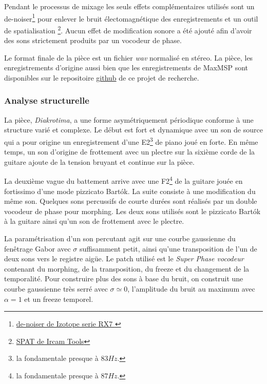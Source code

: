 Pendant le processus de mixage les seuls effets complémentaires utilisés sont un de-noiser\footnote{\href{https://www.izotope.com/en/products/repair-and-edit/rx.html}{de-noiser de Izotope serie RX7 }} pour enlever le bruit électomagnétique des enregistrements et un outil de spatialisation \footnote{\href{http://forumnet.ircam.fr/product/spat-en/}{SPAT de Ircam Tools}}. Aucun effet de modification sonore a été ajouté afin d'avoir des sons strictement produits par un vocodeur de phase.

Le format finale de la pièce est un fichier \textit{wav} normalisé en stéreo. La pièce, les enregistrements d'origine aussi bien que les enregistrements de MaxMSP sont disponibles sur le repositoire \href{https://github.com/melkisedeath/Memoire-du-Master-Paris8---Domaines-fondtionnels-du-vocodeur-de-phase}{github} de ce projet de recherche. 

\subsubsection{Analyse structurelle}

La pièce, \textit{Diakrotima}, a une forme asymétriquement périodique conforme à une structure varié et complexe. Le début est fort et dynamique avec un son de source qui a pour origine un enregistrement d'une E2\footnote{la fondamentale presque à $83 Hz$.} de piano joué en forte. En même temps, un son d'origine de frottement avec un plectre sur la sixième corde de la guitare ajoute de la tension bruyant et continue sur la pièce.

La deuxième vague du battement arrive avec une F2\footnote{la fondamentale presque à $87 Hz$.} de la guitare jouée en fortissimo d'une mode pizzicato Bartók. La suite consiste à une modification du même son. Quelques sons percussifs de courte durées sont réalisés par un double vocodeur de phase pour morphing. Les deux sons utilisés sont le pizzicato Bartók à la guitare ainsi qu'un son de frottement avec le plectre. 

La paramétrisation d'un son percutant agit sur une courbe gaussienne du fenêtrage Gabor avec $\sigma$ suffisamment petit, ainsi qu'une transposition de l'un de deux sons vers le registre aigüe. Le patch utilisé est le \textit{Super Phase vocodeur} contenant du morphing, de la transposition, du freeze et du changement de la temporalité. Pour construire plus des sons à base du bruit, on construit une courbe gaussienne très serré avec $\sigma \simeq 0$, l'amplitude du bruit au maximum avec $\alpha = 1$ et un freeze temporel.

